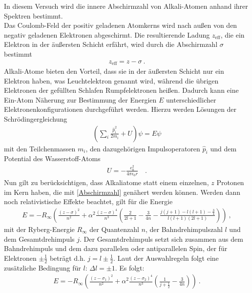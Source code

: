 In diesem Versuch wird die innere Abschirmzahl von Alkali-Atomen anhand ihrer Spektren bestimmt. \\
Das Coulomb-Feld der positiv geladenen Atomkerns wird nach außen von den negativ geladenen Elektronen abgeschirmt. Die resultierende Ladung $z_\text{eff}$, die ein Elektron in der äußersten Schicht  erfährt, wird durch die Abschirmzahl $\sigma$ bestimmt
\begin{align}\label{Abschirmzahl}
z_\text{eff} = z - \sigma \ .
\end{align}
Alkali-Atome bieten den Vorteil, dass sie in der äußersten Schicht nur ein Elektron haben, was Leuchtelektron genannt wird, während die übrigen Elektronen der gefüllten Schlafen  Rumpfelektronen heißen. Dadurch kann eine Ein-Atom Näherung zur Bestimmung der Energien $E$ unterschiedlicher Elektronenkonfigurationen durchgeführt werden. Hierzu werden Lösungen der Schrödingergleichung
\begin{align}
\left(\sum_i \frac{\hat{p}_i^2}{2m_i} + U \right) \psi = E \psi
\end{align}
mit den Teilchenmassen $m_i$,  den dazugehörigen Impulsoperatoren $\hat{p}_i$ und dem Potential des Wasserstoff-Atoms
\begin{align}
	U = -\frac{e_0^2}{4 \pi \epsilon_0 r} \quad .
\end{align}
Nun gilt zu berücksichtigen, dass Alkaliatome statt einem einzelnen, $z$ Protonen im Kern haben, die mit \eqref{Abschirmzahl} genähert werden können. Werden dann noch relativistische Effekte beachtet, gilt für die Energie \begin{align}
	E = - R_\infty \left( \frac{(z-\sigma)^2}{n^2} + \alpha^2 \frac{(z-\sigma)^4}{n^3}\left(\frac{2}{2 l + 1}  - \frac{3}{4n}  - \frac{j(j+1) - l(l+1)-\frac{3}{4}}{l(l+1)(2l+1) }\right) \right) \ ,
\end{align}
mit der Ryberg-Energie $R_\infty$ der Quantenzahl $n$, der Bahndrehimpulszahl $l$ und dem Gesamtdrehimpuls $j$. Der Gesamtdrehimpuls setzt sich zusammen aus dem Bahndrehimpuls und dem dazu parallelen oder antiparallelen Spin, der für Elektronen $\pm\frac{1}{2}$ beträgt d.h. $j = l \pm \frac{1}{2}$. Laut der Auswahlregeln folgt eine zusätzliche Bedingung für $l$: $\Delta l = \pm 1$.
Es folgt:
\begin{align}
	E = - R_\infty \left( \frac{(z-\sigma_1)^2}{n^2} + \alpha^2 \frac{(z-\sigma_2)^4}{n^3}\left(\frac{1}{j+\frac{1}{2}}  - \frac{3}{4n}\right) \right) \ .
\end{align}
